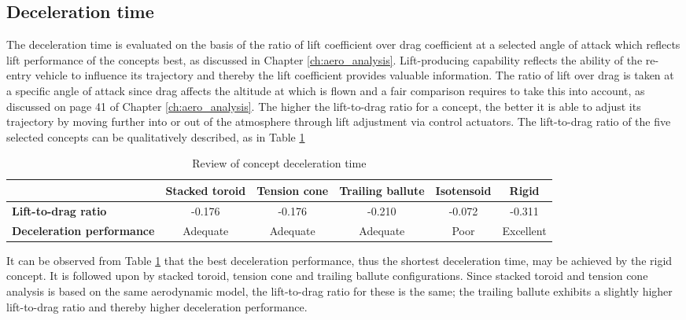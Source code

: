 \subsection{Deceleration time}
The deceleration time is evaluated on the basis of the ratio of lift coefficient over drag coefficient at a selected angle of attack which reflects lift performance of the concepts best, as discussed in Chapter \ref{ch:aero_analysis}. Lift-producing capability reflects the ability of the re-entry vehicle to influence its trajectory and thereby the lift coefficient provides valuable information. The ratio of lift over drag is taken at a specific angle of attack since drag affects the altitude at which is flown and a fair comparison requires to take this into account, as discussed on page 41 of Chapter \ref{ch:aero_analysis}. The higher the lift-to-drag ratio for a concept, the better it is able to adjust its trajectory by moving further into or out of the atmosphere through lift adjustment via control actuators. The lift-to-drag ratio of the five selected concepts can be qualitatively described, as in Table \ref{tab:decel}

\begin{table}[h]
\centering
\caption{Review of concept deceleration time}
\begin{tabular}{|p{2.5cm}|c|c|c|c|c|}
\hline
\textbf{}                          & \textbf{Stacked toroid} & \textbf{Tension cone} & \textbf{Trailing ballute} & \textbf{Isotensoid} & \textbf{Rigid} \\ \hline
\textbf{Lift-to-drag ratio} & \cellcolor{yellow!75} -0.176  &\cellcolor{yellow!75} -0.176   &\cellcolor{yellow!75} -0.210 & \cellcolor{red!60} -0.072 &\cellcolor{green!70} -0.311              \\ \hline
\textbf{Deceleration performance} &\cellcolor{yellow!75} Adequate &\cellcolor{yellow!75}  Adequate  &\cellcolor{yellow!75} Adequate & \cellcolor{red!60}     Poor       &\cellcolor{green!70} Excellent                 \\ \hline
\end{tabular}
\label{tab:decel}
\end{table}

It can be observed from Table \ref{tab:decel} that the best deceleration performance, thus the shortest deceleration time, may be achieved by the rigid concept. It is followed upon by stacked toroid, tension cone and trailing ballute configurations. Since stacked toroid and tension cone analysis is based on the same aerodynamic model, the lift-to-drag ratio for these is the same; the trailing ballute exhibits a slightly higher lift-to-drag ratio and thereby higher deceleration performance.

